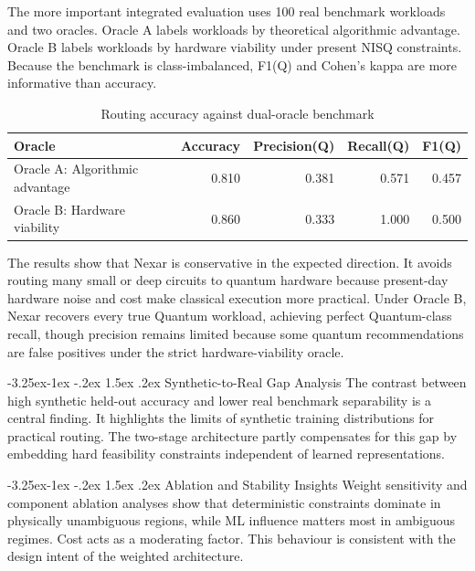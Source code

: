 \documentclass[12pt,a4paper]{report}
\makeatletter
\renewcommand\subsection{\@startsection{subsection}{2}{\z@}%
  {-3.25ex\@plus -1ex \@minus -.2ex}%
  {1.5ex \@plus .2ex}%
  {\normalfont\bfseries\fontsize{12pt}{16pt}\selectfont}}
\makeatother
\begin{document}
The more important integrated evaluation uses 100 real benchmark workloads and two oracles. Oracle A labels workloads by theoretical algorithmic advantage. Oracle B labels workloads by hardware viability under present NISQ constraints. Because the benchmark is class-imbalanced, F1(Q) and Cohen's kappa are more informative than accuracy.

\begin{table}[H]
\centering
\caption{Routing accuracy against dual-oracle benchmark}
\begin{tabular}{lrrrr}
\toprule
\textbf{Oracle} & \textbf{Accuracy} & \textbf{Precision(Q)} & \textbf{Recall(Q)} & \textbf{F1(Q)} \\
\midrule
Oracle A: Algorithmic advantage & 0.810 & 0.381 & 0.571 & 0.457 \\
Oracle B: Hardware viability & 0.860 & 0.333 & 1.000 & 0.500 \\
\bottomrule
\end{tabular}
\end{table}

The results show that Nexar is conservative in the expected direction. It avoids routing many small or deep circuits to quantum hardware because present-day hardware noise and cost make classical execution more practical. Under Oracle B, Nexar recovers every true Quantum workload, achieving perfect Quantum-class recall, though precision remains limited because some quantum recommendations are false positives under the strict hardware-viability oracle.

\subsection{Synthetic-to-Real Gap Analysis}
The contrast between high synthetic held-out accuracy and lower real benchmark separability is a central finding. It highlights the limits of synthetic training distributions for practical routing. The two-stage architecture partly compensates for this gap by embedding hard feasibility constraints independent of learned representations.

\subsection{Ablation and Stability Insights}
Weight sensitivity and component ablation analyses show that deterministic constraints dominate in physically unambiguous regions, while ML influence matters most in ambiguous regimes. Cost acts as a moderating factor. This behaviour is consistent with the design intent of the weighted architecture.
\end{document}
